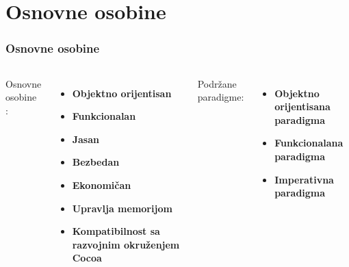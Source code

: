 \documentclass{beamer}
\begin{document}
\section{Osnovne osobine}
\begin{frame}
\frametitle{Osnovne osobine}

\begin{columns}[t]
Osnovne osobine \cite{swift_programming}:
\begin{itemize}
\item{\textbf{Objektno orijentisan}}
\item{\textbf{Funkcionalan}}
\item{\textbf{Jasan}}
\item{\textbf{Bezbedan}}
\item{\textbf{Ekonomičan}}
\item{\textbf{Upravlja memorijom}}
\item{\textbf{Kompatibilnost sa razvojnim okruženjem Cocoa}}
\end{itemize}

Podržane paradigme:
\begin{itemize}
\item{\textbf{Objektno orijentisana paradigma}}
\item{\textbf{Funkcionalana paradigma}}
\item{\textbf{Imperativna paradigma}}
\end{itemize}

\end{columns}
\end{frame}

\end{document}
